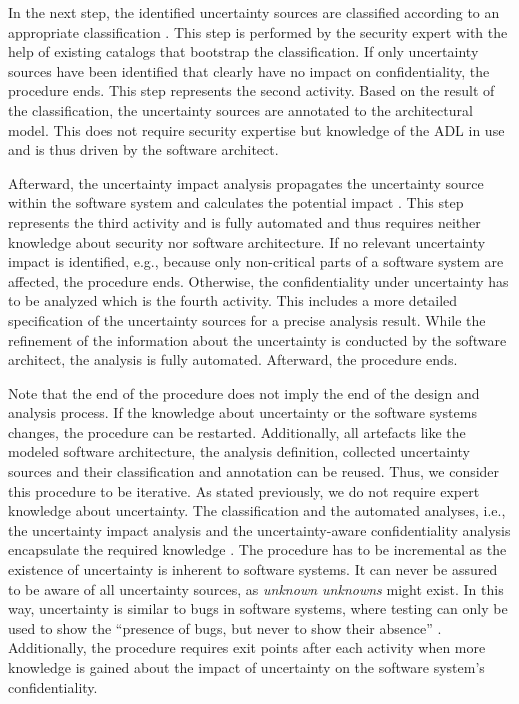 In the next step, the identified uncertainty sources are classified according to an appropriate classification \cite{hahner_classification_2023}.
This step is performed by the security expert with the help of existing catalogs that bootstrap the classification.
If only uncertainty sources have been identified that clearly have no impact on confidentiality, the procedure ends.
This step represents the second activity.
Based on the result of the classification, the uncertainty sources are annotated to the architectural model.
This does not require security expertise but knowledge of the \ac{ADL} in use and is thus driven by the software architect.

Afterward, the uncertainty impact analysis propagates the uncertainty source within the software system and calculates the potential impact \cite{hahner_architecture-based_2023}.
This step represents the third activity and is fully automated and thus requires neither knowledge about security nor software architecture.
If no relevant uncertainty impact is identified, e.g., because only non-critical parts of a software system are affected, the procedure ends.
Otherwise, the confidentiality under uncertainty has to be analyzed which is the fourth activity.
This includes a more detailed specification of the uncertainty sources for a precise analysis result.
While the refinement of the information about the uncertainty is conducted by the software architect, the analysis is fully automated.
Afterward, the procedure ends.

Note that the end of the procedure does not imply the end of the design and analysis process.
If the knowledge about uncertainty or the software systems changes, the procedure can be restarted.
Additionally, all artefacts like the modeled software architecture, the analysis definition, collected uncertainty sources and their classification and annotation can be reused.
Thus, we consider this procedure to be iterative.
As stated previously, we do not require expert knowledge about uncertainty.
The classification and the automated analyses, i.e., the uncertainty impact analysis and the uncertainty-aware confidentiality analysis encapsulate the required knowledge \cite{hahner_model-based_2023}.
The procedure has to be incremental as the existence of uncertainty is inherent to software systems.
It can never be assured to be aware of all uncertainty sources, as \emph{unknown unknowns} \cite{perez-palacin_uncertainties_2014} might exist.
In this way, uncertainty is similar to bugs in software systems, where testing can only be used to show the \enquote{presence of bugs, but never to show their absence} \cite{dijkstra_notes_1970}.
Additionally, the procedure requires exit points after each activity when more knowledge is gained about the impact of uncertainty on the software system's confidentiality.

